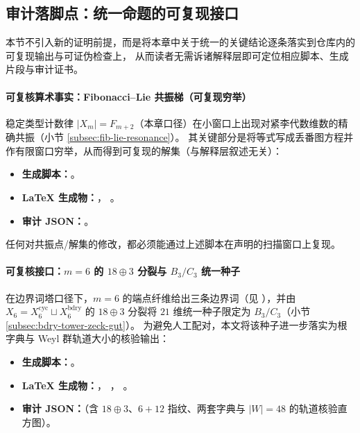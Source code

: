 \subsection{审计落脚点：统一命题的可复现接口}\label{subsec:group-unification-audit-pointers}

本节不引入新的证明前提，而是将本章中关于统一的关键结论逐条落实到仓库内的可复现输出与可证伪检查上，
从而读者无需诉诸解释层即可定位相应脚本、生成片段与审计证书。

\paragraph{可复核算术事实：Fibonacci--Lie 共振梯（可复现穷举）}
稳定类型计数律 \(|X_m|=F_{m+2}\)（本章口径）在小窗口上出现对紧李代数维数的精确共振（小节 \ref{subsec:fib-lie-resonance}）。
其关键部分是将等式写成丢番图方程并作有限窗口穷举，从而得到可复现的解集（与解释层叙述无关）：
\begin{itemize}
  \item \textbf{生成脚本：}\texttt{}。
  \item \textbf{LaTeX 生成物：}\texttt{}，
  \texttt{}。
  \item \textbf{审计 JSON：}\texttt{}。
\end{itemize}
任何对共振点/解集的修改，都必须能通过上述脚本在声明的扫描窗口上复现。

\paragraph{可复核接口：\(m=6\) 的 \(18\oplus 3\) 分裂与 \(B_3/C_3\) 统一种子}
在边界词塔口径下，\(m=6\) 的端点纤维给出三条边界词（见 \texttt{}），并由 \(X_6=X_6^{\mathrm{cyc}}\sqcup X_6^{\mathrm{bdry}}\) 的 \(18\oplus 3\) 分裂将 \(21\) 维统一种子限定为 \(B_3/C_3\)（小节 \ref{subsec:bdry-tower-zeck-gut}）。
为避免人工配对，本文将该种子进一步落实为根字典与 Weyl 群轨道大小的核验输出：
\begin{itemize}
  \item \textbf{生成脚本：}\texttt{}。
  \item \textbf{LaTeX 生成物：}\texttt{}，
  \texttt{}，
  \texttt{}。
  \item \textbf{审计 JSON：}\texttt{}（含 \(18\oplus 3\)、\(6+12\) 指纹、两套字典与 \(|W|=48\) 的轨道核验直方图）。
\end{itemize}

